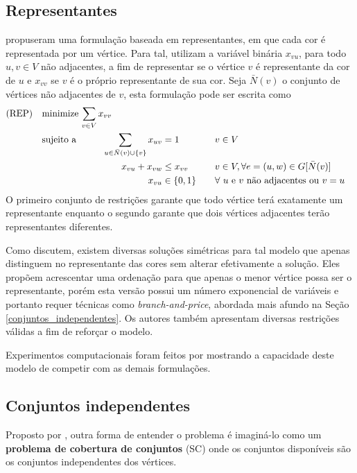 \documentclass[11pt]{article}
\begin{document}
\subsection{Representantes}
\label{sec:org3a16297}
\textcite{Campelo2004CliquesHolesVertex} propuseram uma formulação baseada em representantes, em que cada cor é representada por um vértice.
Para tal, utilizam a variável binária \(x_{vu}\), para todo \(u, v \in V\) não adjacentes, a fim de representar se o vértice \(v\) é representante da cor de \(u\) e \(x_{vv}\) se \(v\) é o próprio representante de sua cor.
Seja \(\bar{N}(v)\) o conjunto de vértices não adjacentes de \(v\), esta formulação pode ser escrita como
\begin{alignat*}{4}
\mathrm{(REP)} \quad & \omit\rlap{minimize  $\displaystyle \sum_{v \in V} x_{vv}$} \\
& \mbox{sujeito a}&& \quad & \sum_{u \in \bar{N}(v) \cup \{v\}} x_{uv}&= 1        & \quad & v \in V \\
&                 &&   & x_{vu} + x_{vw}    & \leq x_{vv} &   & v \in V, \forall e = (u,w) \in G[\bar{N}(v)] \\
&                 &&   & x_{vu}       & \in \{0,1\} &   & \forall \text{ $u$ e $v$ não adjacentes ou $v = u$}
\end{alignat*}
O primeiro conjunto de restrições garante que todo vértice terá exatamente um representante enquanto o segundo garante que dois vértices adjacentes terão representantes diferentes.

Como \textcite{Campelo2008AsymmetricRepresentativesFormulation} discutem, existem diversas soluções simétricas para tal modelo que apenas distinguem no representante das cores sem alterar efetivamente a solução.
Eles propõem acrescentar uma ordenação para que apenas o menor vértice possa ser o representante, porém esta versão possui um número exponencial de variáveis e portanto requer técnicas como \emph{branch-and-price}, abordada mais afundo na Seção \ref{conjuntos_independentes}.
Os autores também apresentam diversas restrições válidas a fim de reforçar o modelo.

Experimentos computacionais foram feitos por \textcite{Jabrayilov2018NewIntegerLinear} mostrando a capacidade deste modelo de competir com as demais formulações.

\subsection{Conjuntos independentes}
\label{sec:org63d45c4}
\label{conjuntos_independentes}
Proposto por \textcite{Mehrotra1996ColumnGenerationApproach}, outra forma de entender o problema é imaginá-lo como um \textbf{problema de cobertura de conjuntos} (SC) onde os conjuntos disponíveis são os conjuntos independentes dos vértices.
\end{document}
